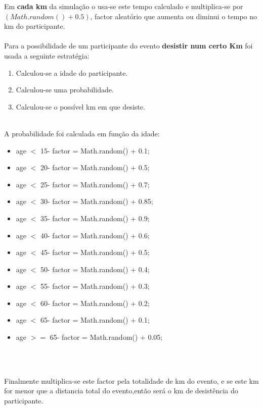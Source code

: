 \documentclass[10pt,notitlepage]{article}
\begin{document}
Em \textbf{cada km} da simulação o usa-se este tempo calculado e multiplica-se por $(Math.random() + 0.5)$, factor aleatório que aumenta ou diminui o tempo no km do participante.
~\\~\\
\newpage
Para a possibilidade de um participante do evento  \textbf{desistir num certo Km} foi usada a seguinte estratégia:
\begin{enumerate}
\item Calculou-se a idade do participante.
\item Calculou-se uma probabilidade.
\item Calculou-se o possível km em que desiste.
\end{enumerate}~\\
A probabilidade foi calculada em função da idade:
\begin{itemize}
\item age $<$ 15- factor = Math.random() + 0.1;
\item age $<$ 20- factor = Math.random() + 0.5;
\item age $<$ 25- factor = Math.random() + 0.7;
\item age $<$ 30- factor = Math.random() + 0.85;
\item age $<$ 35- factor = Math.random() + 0.9;
\item age $<$ 40- factor = Math.random() + 0.6;
\item age $<$ 45- factor = Math.random() + 0.5;
\item age $<$ 50- factor = Math.random() + 0.4;
\item age $<$ 55- factor = Math.random() + 0.3;
\item age $<$ 60- factor = Math.random() + 0.2;
\item age $<$ 65- factor = Math.random() + 0.1;
\item age $>=$ 65- factor = Math.random() + 0.05;
\end{itemize}~\\~

Finalmente multiplica-se este factor pela totalidade de km do evento, e se este km for menor que a distancia total do evento,então será o km de desistência do participante.
\end{document}
